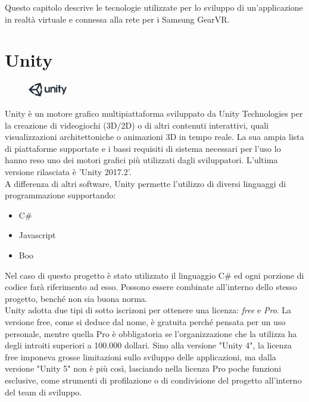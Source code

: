 Questo capitolo descrive le tecnologie utilizzate per lo sviluppo di un'applicazione in realtà virtuale e connessa alla rete per i Samsung GearVR.\\

\section{Unity}
\begin{figure} %
	\centering
	\includegraphics[width=0.15\textwidth]{figure/UnityLogo}
\end{figure}
Unity è un motore grafico multipiattaforma sviluppato da Unity Technologies per la creazione di videogiochi (3D/2D) o di altri contenuti interattivi, quali visualizzazioni architettoniche o animazioni 3D in tempo reale.\cite{UnityDesc}
La sua ampia lista di piattaforme supportate \cite{UnityPlat} e i bassi requisiti di sistema necessari per l'uso \cite{UnityReq} lo hanno reso uno dei motori grafici più utilizzati dagli sviluppatori. L'ultima versione rilasciata è 'Unity 2017.2'. \\
A differenza di altri software, Unity permette l'utilizzo di diversi linguaggi di programmazione supportando:
\begin{itemize}
	\item C\#
	\item Javascript
	\item Boo
\end{itemize}
Nel caso di questo progetto è stato utilizzato il linguaggio C\# ed ogni porzione di codice farà riferimento ad esso.
Possono essere combinate all'interno dello stesso progetto, benché non sia buona norma. \\
Unity adotta due tipi di sotto iscrizoni per ottenere una licenza: \textit{free} e \textit{Pro}. La versione free, come si deduce dal nome, è gratuita perché pensata per un uso personale, mentre quella Pro è obbligatoria se l'organizzazione che la utilizza ha degli introiti superiori a 100.000 dollari.
Sino alla versione "Unity 4", la licenza free imponeva grosse limitazioni sullo sviluppo delle applicazioni, ma dalla versione "Unity 5" non è più così, lasciando nella licenza Pro poche funzioni esclusive, come strumenti di profilazione o di condivisione del progetto all'interno del team di sviluppo.  

